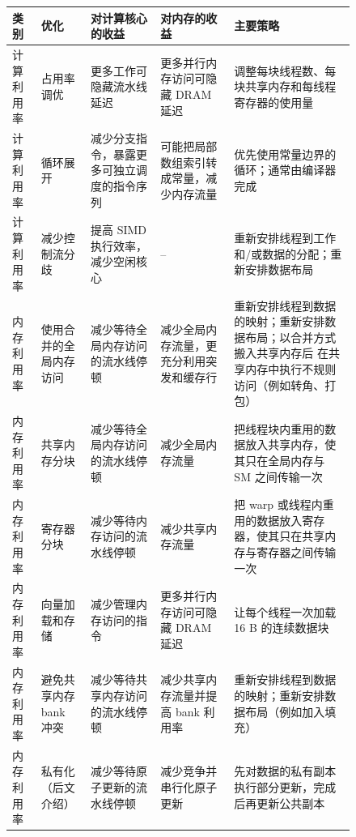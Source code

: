 \begin{figure}[htbp]
  \centering
  \scriptsize
  \renewcommand{\arraystretch}{1.2}
  \begin{tabularx}{0.99\textwidth}{|
    >{\raggedright\arraybackslash}p{}|
    >{\raggedright\arraybackslash}p{}|
    >{\raggedright\arraybackslash}p{}|
    >{\raggedright\arraybackslash}p{}|
    >{\raggedright\arraybackslash}X|}
    \hline
    \textbf{类别} & \textbf{优化} & \textbf{对计算核心的收益} &
    \textbf{对内存的收益} & \textbf{主要策略}\\ \hline
    计算利用率 & 占用率调优
      & 更多工作可隐藏流水线延迟
      & 更多并行内存访问可隐藏 DRAM 延迟
      & 调整每块线程数、每块共享内存和每线程寄存器的使用量\\ \hline
    计算利用率 & 循环展开
      & 减少分支指令，暴露更多可独立调度的指令序列
      & 可能把局部数组索引转成常量，减少内存流量
      & 优先使用常量边界的循环；通常由编译器完成\\ \hline
    计算利用率 & 减少控制流分歧
      & 提高 SIMD 执行效率，减少空闲核心
      & --
      & 重新安排线程到工作和/或数据的分配；重新安排数据布局\\ \hline
    内存利用率 & 使用合并的全局内存访问
      & 减少等待全局内存访问的流水线停顿
      & 减少全局内存流量，更充分利用突发和缓存行
      & 重新安排线程到数据的映射；重新安排数据布局；以合并方式搬入共享内存后
      在共享内存中执行不规则访问（例如转角、打包）\\ \hline
    内存利用率 & 共享内存分块
      & 减少等待全局内存访问的流水线停顿
      & 减少全局内存流量
      & 把线程块内重用的数据放入共享内存，使其只在全局内存与 SM 之间传输一次\\ \hline
    内存利用率 & 寄存器分块
      & 减少等待内存访问的流水线停顿
      & 减少共享内存流量
      & 把 warp 或线程内重用的数据放入寄存器，使其只在共享内存与寄存器之间传输一次\\ \hline
    内存利用率 & 向量加载和存储
      & 减少管理内存访问的指令
      & 更多并行内存访问可隐藏 DRAM 延迟
      & 让每个线程一次加载 16 B 的连续数据块\\ \hline
    内存利用率 & 避免共享内存 bank 冲突
      & 减少等待共享内存访问的流水线停顿
      & 减少共享内存流量并提高 bank 利用率
      & 重新安排线程到数据的映射；重新安排数据布局（例如加入填充）\\ \hline
    内存利用率 & 私有化（后文介绍）
      & 减少等待原子更新的流水线停顿
      & 减少竞争并串行化原子更新
      & 先对数据的私有副本执行部分更新，完成后再更新公共副本\\ \hline

\end{tabularx}
\end{figure}
